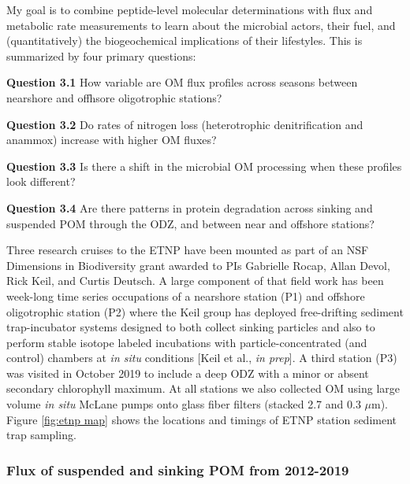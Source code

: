 \documentclass[12pt, letterpaper, twoside]{article}
\begin{document}
My goal is to combine peptide-level molecular determinations with flux and metabolic rate measurements to learn about the microbial actors, their fuel, and (quantitatively) the biogeochemical implications of their lifestyles. This is summarized by four primary questions:

\bigskip

\textbf{Question 3.1} How variable are OM flux profiles across seasons between nearshore and offhsore oligotrophic stations? 

\bigskip

\textbf{Question 3.2} Do rates of nitrogen loss (heterotrophic denitrification and anammox) increase with higher OM fluxes?

\bigskip

\textbf{Question 3.3} Is there a shift in the microbial OM processing when these profiles look different?

\bigskip

\textbf{Question 3.4} Are there patterns in protein degradation across sinking and suspended POM through the ODZ, and between near and offshore stations?

\bigskip

Three research cruises to the ETNP have been mounted as part of an NSF Dimensions in Biodiversity grant awarded to PIs Gabrielle Rocap, Allan Devol, Rick Keil, and Curtis Deutsch. A large component of that field work has been week-long time series occupations of a nearshore station (P1) and offshore oligotrophic station (P2) where the Keil group has deployed free-drifting sediment trap-incubator systems designed to both collect sinking particles and also to perform stable isotope labeled incubations with particle-concentrated (and control) chambers at \textit{in situ} conditions [Keil et al., \textit{in prep}]. A third station (P3) was visited in October 2019 to include a deep ODZ with a minor or absent secondary chlorophyll maximum. At all stations we also collected OM using large volume \textit{in situ} McLane pumps onto glass fiber filters (stacked 2.7 and 0.3 $\mu$m). Figure \ref{fig:etnp map} shows the locations and timings of ETNP station sediment trap sampling.

\bigskip

\subsubsection{Flux of suspended and sinking POM from 2012-2019}
\end{document}
